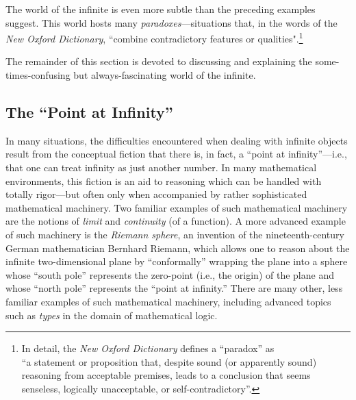 \medskip

The world of the infinite is even more subtle than the preceding examples suggest.  This world hosts many {\em paradoxes}---situations that, in the words of the {\it New Oxford Dictionary}, ``combine contradictory features or qualities".\footnote{In detail, the {\it New Oxford Dictionary} defines a ``paradox'' as \\
``a statement or proposition that, despite sound (or apparently sound) reasoning from acceptable premises, leads to a conclusion that seems senseless, logically unacceptable, or self-contradictory''.}

\medskip

The remainder of this section is devoted to discussing and explaining the some-times-confusing but always-fascinating world of the infinite.

\subsection{The ``Point at Infinity''}
\label{sec:point-at-infinity}

   
In many situations, the difficulties encountered when dealing with infinite objects result from the conceptual fiction that there is, in fact, a ``point at infinity''---i.e., that one can treat infinity as just
another number.  In many mathematical environments, this fiction is an aid to reasoning which can be handled with totally rigor---but often only when accompanied by rather sophisticated mathematical machinery.  Two familiar examples of such mathematical machinery are the notions
of  {\it limit} and {\it continuity} (of a function).  A more advanced example of such machinery is the {\it Riemann sphere}, an invention of the nineteenth-century German mathematician Bernhard Riemann, which allows one to reason about the infinite two-dimensional plane by ``conformally'' wrapping the plane into a sphere whose ``south pole'' represents the zero-point (i.e., the origin) of the plane and whose ``north pole'' represents the ``point at infinity.''  There are many other, less familiar examples of such mathematical machinery, including advanced topics such as {\it types} in the domain of mathematical logic.

\medskip

